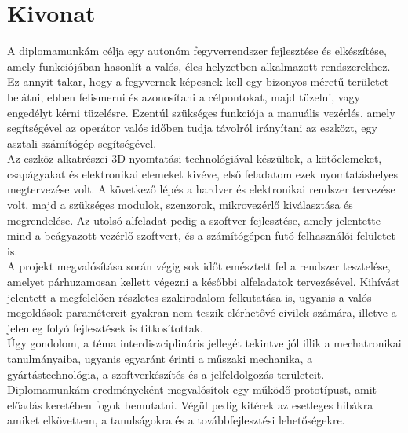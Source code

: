 \setcounter{page}{1}

\selecthungarian

\chapter*{Kivonat}

A diplomamunkám célja egy autonóm fegyverrendszer fejlesztése és elkészítése, amely funkciójában hasonlít a valós, éles helyzetben alkalmazott rendszerekhez. Ez annyit takar, hogy a fegyvernek képesnek kell egy bizonyos méretű területet belátni, ebben felismerni és azonosítani a célpontokat, majd tüzelni, vagy engedélyt kérni tüzelésre. Ezentúl szükséges funkciója a manuális vezérlés, amely segítségével az operátor valós időben tudja távolról irányítani az eszközt, egy asztali számítógép segítségével.\\

Az eszköz alkatrészei 3D nyomtatási technológiával készültek, a kötőelemeket, csapágyakat és elektronikai elemeket kivéve, első feladatom ezek nyomtatáshelyes megtervezése volt. A következő lépés a hardver és elektronikai rendszer tervezése volt, majd a szükséges modulok, szenzorok, mikrovezérlő kiválasztása és megrendelése. Az utolsó alfeladat pedig a szoftver fejlesztése, amely jelentette mind a beágyazott vezérlő szoftvert, és a számítógépen futó felhasználói felületet is.\\

A projekt megvalósítása során végig sok időt emésztett fel a rendszer tesztelése, amelyet párhuzamosan kellett végezni a későbbi alfeladatok tervezésével. Kihívást jelentett a megfelelően részletes szakirodalom felkutatása is, ugyanis a valós megoldások paramétereit gyakran nem teszik elérhetővé civilek számára, illetve a jelenleg folyó fejlesztések is titkosítottak.\\

Úgy gondolom, a téma interdiszciplináris jellegét tekintve jól illik a mechatronikai tanulmányaiba, ugyanis egyaránt érinti a műszaki mechanika,  a gyártástechnológia, a szoftverkészítés és a jelfeldolgozás területeit.\\

Diplomamunkám eredményeként megvalósítok egy működő prototípust, amit előadás keretében fogok bemutatni. Végül pedig kitérek az esetleges hibákra amiket elkövettem, a tanulságokra és a továbbfejlesztési lehetőségekre.


